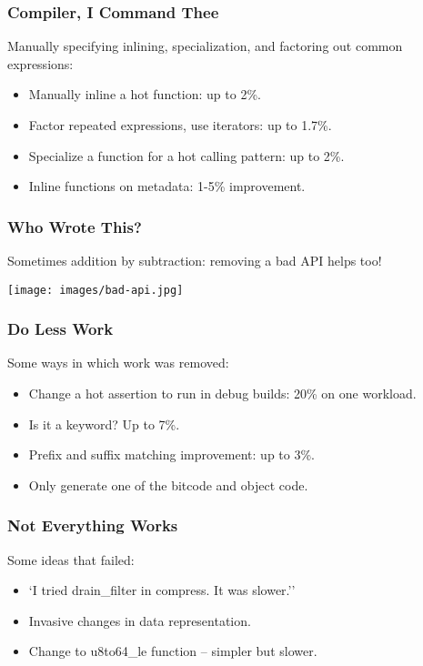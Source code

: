 \begin{frame}
\frametitle{Compiler, I Command Thee}

 Manually specifying inlining, specialization, and factoring out common expressions:
\begin{itemize}
	\item Manually inline a hot function: up to 2\%.
	\item Factor repeated expressions, use iterators: up to 1.7\%.
	\item Specialize a function for a hot calling pattern: up to 2\%.
	\item Inline functions on metadata: 1-5\% improvement.
\end{itemize}


\end{frame}


\begin{frame}
\frametitle{Who Wrote This?}

Sometimes addition by subtraction: removing a bad API helps too!

\begin{center}
	\texttt{[image: images/bad-api.jpg]}
\end{center}


\end{frame}


\begin{frame}
\frametitle{Do Less Work}

Some ways in which work was removed:

\begin{itemize}
	\item Change a hot assertion to run in debug builds: 20\% on one workload.
	\item Is it a keyword? Up to 7\%.
	\item Prefix and suffix matching improvement: up to 3\%.
	\item Only generate one of the bitcode and object code.
\end{itemize}


\end{frame}


\begin{frame}
\frametitle{Not Everything Works}

Some ideas that failed:

\begin{itemize}
	\item `I tried drain\_filter in compress. It was slower.''
	\item Invasive changes in data representation.
	\item Change to u8to64\_le function -- simpler but slower.
\end{itemize}

\end{frame}


